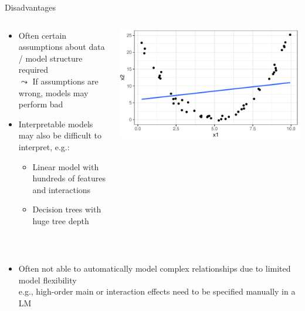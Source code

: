 \documentclass[11pt,compress,t,notes=noshow, aspectratio=169, xcolor=table]{beamer}
\begin{document}
\begin{frame}{Disadvantages}
\begin{columns}
\begin{column}{0.72\textwidth}
    \begin{itemize}%
    \itemsep1em
        \item<1-> Often certain assumptions about data / model structure required\\
        $\leadsto$ If assumptions are wrong, models may perform bad 
        \item<2-> Interpretable models may also be difficult to interpret, e.g.:
    \begin{itemize}
        \item Linear model with hundreds of features and interactions 
        \item Decision trees with huge tree depth
    \end{itemize}
    \end{itemize}
\end{column}
\begin{column}{0.28\textwidth}
    \begin{center}
        \includegraphics[width = \textwidth]{figure/lm_bad_fit.pdf} 
    \end{center}
\end{column}
\end{columns}
\quad \\

\begin{itemize}
\itemsep1em
        \item<3-> Often not able to automatically model complex relationships due to limited model flexibility
        \\
        e.g., high-order main or interaction effects need to be specified manually in a LM


\end{itemize}
\end{frame}
\end{document}

